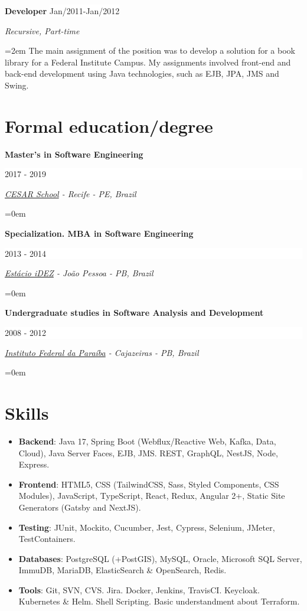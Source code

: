 \documentclass[a4paper,10pt]{article}
\newcommand{\NewPart}[1]{\section*{\large{\textbf{#1}}}}
\newcommand{\EducationEntry}[4]{
		\noindent \textbf{#1} \hfill 					%
		\colorbox{White}{%
			\parbox{6em}{%
			\hfill\color{Black}#2}} \par				%
		\noindent \textit{#3} \par						%
		\noindent \hangindent=0em\hangafter=0 \normalsize #4 	%
		\normalsize \par
		\vspace{0.5em}
	}
\newcommand{\WorkEntry}[4]{								%
		\noindent \textbf{#1} \hfill 					%
		\colorbox{White}{\color{Black}#2} \par			%
		\noindent \textit{#3} \par						%
		\noindent\hangindent=2em\hangafter=0 \normalsize #4 	%
		\normalsize \par
		\vspace{0.5em}
	}
\begin{document}
\WorkEntry{Developer}{Jan/2011-Jan/2012}{Recursive, Part-time}{The main assignment of the position was to develop a solution for a book library for a Federal Institute Campus. My assignments involved front-end and back-end development using Java technologies, such as EJB, JPA, JMS and Swing.}

\NewPart{Formal education/degree}

\EducationEntry{Master's in Software Engineering}{2017 - 2019}{\href{https://cesar.school/}{CESAR School} - Recife - PE, Brazil}{}

\EducationEntry{Specialization. MBA in Software Engineering}{2013 - 2014}{\href{https://estacio.br/}{Estácio iDEZ} - João Pessoa - PB, Brazil}{}

\EducationEntry{Undergraduate studies in Software Analysis and Development}{2008 - 2012}{\href{https://www.ifpb.edu.br/}{Instituto Federal da Paraíba} - Cajazeiras - PB, Brazil}{}



\NewPart{Skills}
\begin{multicols}{2}
\begin{itemize}
    \item \textbf{Backend}: Java 17, Spring Boot (Webflux/Reactive Web, Kafka, Data, Cloud), Java Server Faces, EJB, JMS. REST, GraphQL, NestJS, Node, Express.
    \item \textbf{Frontend}: HTML5, CSS (TailwindCSS, Sass, Styled Components, CSS Modules), JavaScript, TypeScript, React, Redux, Angular 2+, Static Site Generators (Gatsby and NextJS).
    \item \textbf{Testing}: JUnit, Mockito, Cucumber, Jest, Cypress, Selenium, JMeter, TestContainers.
    \item \textbf{Databases}: PostgreSQL (+PostGIS), MySQL, Oracle, Microsoft SQL Server, ImmuDB, MariaDB, ElasticSearch \& OpenSearch, Redis.
    \item \textbf{Tools}: Git, SVN, CVS. Jira. Docker, Jenkins, TravisCI. Keycloak. Kubernetes \& Helm. Shell Scripting. Basic understandment about Terraform.
\end{itemize}
\end{multicols}


\end{document}
